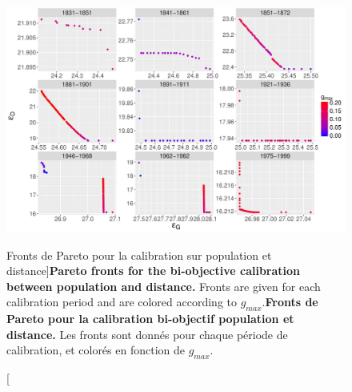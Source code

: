 

\begin{figure}
	\includegraphics[width=\linewidth]{Figures/Final/6-2-3-fig-macrocoevol-pareto.jpg}
	\caption[Pareto fronts for the calibration on population and distance][Fronts de Pareto pour la calibration sur population et distance]{\textbf{Pareto fronts for the bi-objective calibration between population and distance.} Fronts are given for each calibration period and are colored according to $g_{max}$.\label{fig:macrocoevol:pareto}}{\textbf{Fronts de Pareto pour la calibration bi-objectif population et distance.} Les fronts sont donnés pour chaque période de calibration, et colorés en fonction de $g_{max}$.\label{fig:macrocoevol:pareto}}
\end{figure}




